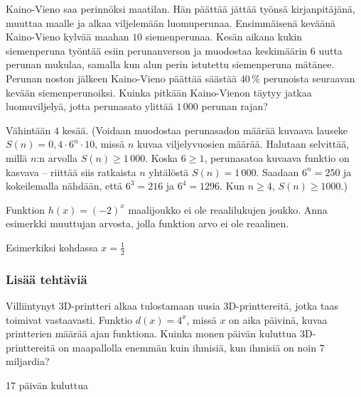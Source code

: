 \begin{tehtavasivu}
\begin{tehtava}
Kaino-Vieno saa perinnöksi maatilan. Hän päättää jättää työnsä kirjanpitäjänä, muuttaa maalle ja alkaa viljelemään luomuperunaa. Ensimmäisenä keväänä Kaino-Vieno kylvää maahan $10$ siemenperunaa. Kesän aikana kukin siemenperuna työntää esiin perunanverson ja muodostaa keskimäärin $6$ uutta perunan mukulaa, samalla kun alun perin istutettu siemenperuna mätänee. Perunan noston jälkeen Kaino-Vieno päättää säästää $40$\,\% perunoista seuraavan kevään siemenperunoiksi. Kuinka pitkään Kaino-Vienon täytyy jatkaa luomuviljelyä, jotta perunasato ylittää $1\,000$ perunan rajan? 
	\begin{vastaus}
	Vähintään $4$ kesää. (Voidaan muodostaa perunasadon määrää kuvaava lauseke $S(n)=0,4\cdot6^n\cdot10$, missä $n$ kuvaa viljelyvuosien määrää. Halutaan selvittää, millä $n$:n arvolla $S(n)\geq1\,000$. Koska $6\geq1$, perunasatoa kuvaava funktio on kasvava -- riittää siis ratkaista $n$ yhtälöstä $S(n)=1\,000$. Saadaan $6^n=250$ ja kokeilemalla nähdään, että $6^3=216$ ja $6^4=1296$. Kun $n\geq4$, $S(n)\geq1000$.)
	\end{vastaus}
\end{tehtava}

\begin{tehtava}
Funktion $ h(x)=(-2)^{x}$ maalijoukko ei ole reaalilukujen joukko. Anna esimerkki muuttujan arvosta, jolla funktion arvo ei ole reaalinen.
	\begin{vastaus}
Esimerkiksi kohdassa $x = \frac{1}{2}$
	\end{vastaus}
\end{tehtava}

\subsubsection*{Lisää tehtäviä}

\begin{tehtava}
Villiintynyt 3D-printteri alkaa tulostamaan uusia 3D-printtereitä, jotka taas toimivat vastaavasti. Funktio $ d(x)=4^{x} $, missä $ x $ on aika päivinä, kuvaa printterien määrää ajan funktiona. Kuinka monen päivän kuluttua 3D-printtereitä on maapallolla enemmän kuin ihmisiä, kun ihmisiä on noin $7$ miljardia?
\begin{vastaus}
17 päivän kuluttua
\end{vastaus}
\end{tehtava}


\end{tehtavasivu}
